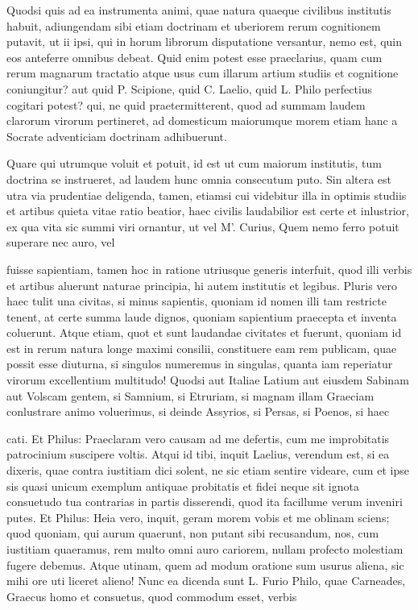  Quodsi quis ad ea instrumenta animi, quae natura quaeque civilibus institutis habuit, adiungendam sibi etiam doctrinam et uberiorem rerum cognitionem putavit, ut ii ipsi, qui in horum librorum disputatione versantur, nemo est, quin eos anteferre omnibus debeat. Quid enim potest esse praeclarius, quam cum rerum magnarum tractatio atque usus cum illarum artium studiis et cognitione coniungitur? aut quid P. Scipione, quid C. Laelio, quid L. Philo perfectius cogitari potest? qui, ne quid praetermitterent, quod ad summam laudem clarorum virorum pertineret, ad domesticum maiorumque morem etiam hanc a Socrate adventiciam doctrinam adhibuerunt.

 Quare qui utrumque voluit et potuit, id est ut cum maiorum institutis, tum doctrina se instrueret, ad laudem hunc omnia consecutum puto. Sin altera est utra via prudentiae deligenda, tamen, etiamsi cui videbitur illa in optimis studiis et artibus quieta vitae ratio beatior, haec civilis laudabilior est certe et inlustrior, ex qua vita sic summi viri ornantur, ut vel M'. Curius, Quem nemo ferro potuit superare nec auro, vel

 fuisse sapientiam, tamen hoc in ratione utriusque generis interfuit, quod illi verbis et artibus aluerunt naturae principia, hi autem institutis et legibus. Pluris vero haec tulit una civitas, si minus sapientis, quoniam id nomen illi tam restricte tenent, at certe summa laude dignos, quoniam sapientium praecepta et inventa coluerunt. Atque etiam, quot et sunt laudandae civitates et fuerunt, quoniam id est in rerum natura longe maximi consilii, constituere eam rem publicam, quae possit esse diuturna, si singulos numeremus in singulas, quanta iam reperiatur virorum excellentium multitudo! Quodsi aut Italiae Latium aut eiusdem Sabinam aut Volscam gentem, si Samnium, si Etruriam, si magnam illam Graeciam conlustrare animo voluerimus, si deinde Assyrios, si Persas, si Poenos, si haec

 cati. Et Philus: Praeclaram vero causam ad me defertis, cum me improbitatis patrocinium suscipere voltis. Atqui id tibi, inquit Laelius, verendum est, si ea dixeris, quae contra iustitiam dici solent, ne sic etiam sentire videare, cum et ipse sis quasi unicum exemplum antiquae probitatis et fidei neque sit ignota consuetudo tua contrarias in partis disserendi, quod ita facillume verum inveniri putes. Et Philus: Heia vero, inquit, geram morem vobis et me oblinam sciens; quod quoniam, qui aurum quaerunt, non putant sibi recusandum, nos, cum iustitiam quaeramus, rem multo omni auro cariorem, nullam profecto molestiam fugere debemus. Atque utinam, quem ad modum oratione sum usurus aliena, sic mihi ore uti liceret alieno! Nunc ea dicenda sunt L. Furio Philo, quae Carneades, Graecus homo et consuetus, quod commodum esset, verbis

